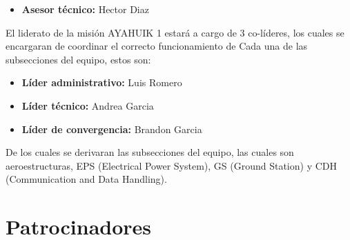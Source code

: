 \documentclass[letterpaper,12pt]{article} %
\begin{document}
    \begin{itemize}
        \item \textbf{Asesor técnico:} Hector Diaz

    \end{itemize}

    El liderato de la misión AYAHUIK 1 estará a cargo de 3 co-líderes,
    los cuales se encargaran de coordinar el correcto funcionamiento de Cada
    una de las subsecciones del equipo, estos son:

    \begin{itemize}
        \item \textbf{Líder administrativo:} Luis Romero
        \item \textbf{Líder técnico:} Andrea Garcia
        \item \textbf{Líder de convergencia:} Brandon Garcia
    
    \end{itemize}

    De los cuales se derivaran las subsecciones del equipo, las cuales son aeroestructuras, EPS (Electrical Power System), GS (Ground Station) y CDH (Communication and Data Handling).

    \newpage
    \section{Patrocinadores}
    \captionsetup[subfigure]{labelformat=empty}
\end{document}
